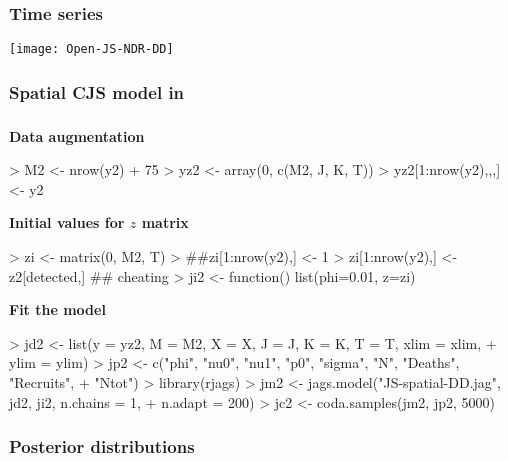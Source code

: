 \documentclass[color=usenames,dvipsnames]{beamer}
\begin{document}
\begin{frame}[fragile]
  \frametitle{Time series}
  \tiny
\vspace{-3mm}
\begin{center}
  \texttt{[image: Open-JS-NDR-DD]}
\end{center}
\end{frame}



\begin{frame}[fragile]
  \frametitle{Spatial CJS model in \jags}
  \vspace{-5mm}
  \tiny \fbox{\parbox{\linewidth}{}}
\end{frame}





\begin{frame}[fragile]
  \frametitle{\jags}
  {\bf Data augmentation}
  \scriptsize
\begin{Schunk}
\begin{Sinput}
> M2 <- nrow(y2) + 75
> yz2 <- array(0, c(M2, J, K, T))
> yz2[1:nrow(y2),,,] <- y2
\end{Sinput}
\end{Schunk}
\pause
\vfill
  {\bf \normalsize Initial values for $z$ matrix}
\begin{Schunk}
\begin{Sinput}
> zi <- matrix(0, M2, T)
> ##zi[1:nrow(y2),] <- 1
> zi[1:nrow(y2),] <- z2[detected,] ## cheating
> ji2 <- function() list(phi=0.01, z=zi)
\end{Sinput}
\end{Schunk}
\pause
\vfill
  {\bf \normalsize Fit the model}
\begin{Schunk}
\begin{Sinput}
> jd2 <- list(y = yz2, M = M2, X = X, J = J, K = K, T = T, xlim = xlim, 
+     ylim = ylim)
> jp2 <- c("phi", "nu0", "nu1", "p0", "sigma", "N", "Deaths", "Recruits", 
+     "Ntot")
> library(rjags)
> jm2 <- jags.model("JS-spatial-DD.jag", jd2, ji2, n.chains = 1, 
+     n.adapt = 200)
> jc2 <- coda.samples(jm2, jp2, 5000)
\end{Sinput}
\end{Schunk}
\end{frame}




\begin{frame}[fragile]
  \frametitle{Posterior distributions}
\begin{center}
\end{center}
\end{frame}
\end{document}
